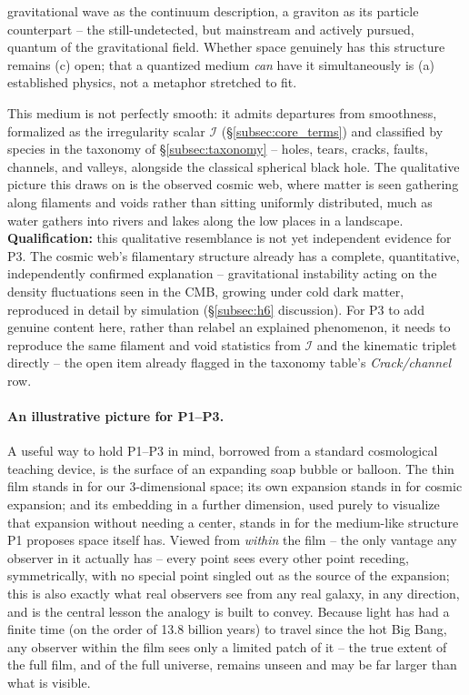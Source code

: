 \documentclass[12pt, a4paper]{article}
\begin{document}
\begin{description}
    gravitational wave as the continuum description, a graviton as
    its particle counterpart -- the still-undetected, but mainstream
    and actively pursued, quantum of the gravitational field. Whether
    space genuinely has this structure remains (c) open; that a
    quantized medium \emph{can} have it simultaneously is (a)
    established physics, not a metaphor stretched to fit.
  \item[P3 (inconsistency).] This medium is not perfectly smooth: it
    admits departures from smoothness, formalized as the irregularity
    scalar $\mathcal{I}$ (\S\ref{subsec:core_terms}) and classified by
    species in the taxonomy of \S\ref{subsec:taxonomy} -- holes,
    tears, cracks, faults, channels, and valleys, alongside the
    classical spherical black hole. The qualitative picture this
    draws on is the observed cosmic web, where matter is seen
    gathering along filaments and voids rather than sitting uniformly
    distributed, much as water gathers into rivers and lakes along
    the low places in a landscape. \textbf{Qualification:} this
    qualitative resemblance is not yet independent evidence for P3.
    The cosmic web's filamentary structure already has a complete,
    quantitative, independently confirmed explanation -- gravitational
    instability acting on the density fluctuations seen in the CMB,
    growing under cold dark matter, reproduced in detail by simulation
    (\S\ref{subsec:h6} discussion). For P3 to add genuine content
    here, rather than relabel an explained phenomenon, it needs to
    reproduce the same filament and void statistics from $\mathcal{I}$
    and the kinematic triplet directly -- the open item already
    flagged in the taxonomy table's \emph{Crack/channel} row.
\end{description}

\paragraph{An illustrative picture for P1--P3.}
A useful way to hold P1--P3 in mind, borrowed from a standard
cosmological teaching device, is the surface of an expanding soap
bubble or balloon. The thin film stands in for our 3-dimensional
space; its own expansion stands in for cosmic expansion; and its
embedding in a further dimension, used purely to visualize that
expansion without needing a center, stands in for the medium-like
structure P1 proposes space itself has. Viewed from \emph{within} the
film -- the only vantage any observer in it actually has -- every
point sees every other point receding, symmetrically, with no special
point singled out as the source of the expansion; this is also
exactly what real observers see from any real galaxy, in any
direction, and is the central lesson the analogy is built to convey.
Because light has had a finite time (on the order of 13.8 billion
years) to travel since the hot Big Bang, any observer within the film
sees only a limited patch of it -- the true extent of the full film,
and of the full universe, remains unseen and may be far larger than
what is visible.
\end{document}
